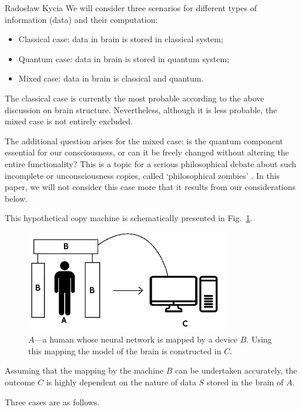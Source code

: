 \begin{artengenv}{Radosław Kycia}
We will consider three scenarios for different types of information (data) and their computation:
\begin{itemize}
 \item {Classical case: data in brain is stored in classical system;}
 \item {Quantum case: data in brain is stored in quantum system;}
 \item {Mixed case: data in brain is classical and quantum.}
\end{itemize}

The classical case is currently the most probable according to the above discussion on brain structure. Nevertheless, although it is less probable, the mixed case is not entirely excluded.

The additional question arises for the mixed case: is the quantum component essential for our consciousness, or can it be freely changed without altering the entire functionality? This is a topic for a serious philosophical debate about such incomplete or unconsciousness copies, called `philosophical zombies' \parencite[see, e.g.][]{pZombie}. In this paper, we will not consider this case more that it results from our considerations below.

This hypothetical copy machine is schematically presented in Fig.~\ref{Fig.BrainTransfer}.
\begin{figure}
\centering
 \includegraphics[width=0.8\textwidth]{kycia/BrainTransfer2.png}
 \caption{$A$---a human whose neural network is mapped by a device $B$. Using this mapping the model of the brain is constructed in $C$.}
 \label{Fig.BrainTransfer}
\end{figure}
Assuming that the mapping by the machine $B$ can be undertaken accurately, the outcome $C$ is highly dependent on the nature of data $S$ stored in the brain of $A$. 

Three cases are as follows.



\end{artengenv}
